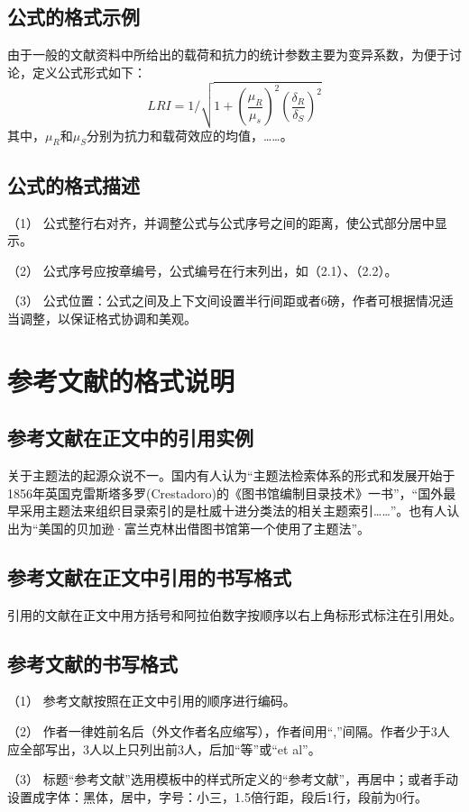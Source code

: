 \subsection{公式的格式示例}
由于一般的文献资料中所给出的载荷和抗力的统计参数主要为变异系数，为便于讨论，定义公式形式如下：
\begin{equation}
LRI = 1/\sqrt{1+(\frac{\mu_R}{\mu_s})^2(\frac{\delta_R}{\delta_S})^2}
\end{equation}
其中，$\mu_R$和$\mu_S$分别为抗力和载荷效应的均值，……。

\subsection{公式的格式描述}
（1） 公式整行右对齐，并调整公式与公式序号之间的距离，使公式部分居中显示。

（2） 公式序号应按章编号，公式编号在行末列出，如（2.1）、（2.2）。

（3） 公式位置：公式之间及上下文间设置半行间距或者6磅，作者可根据情况适当调整，以保证格式协调和美观。

\section{参考文献的格式说明}
\subsection{参考文献在正文中的引用实例}
关于主题法的起源众说不一。国内有人认为“主题法检索体系的形式和发展开始于1856年英国克雷斯塔多罗(Crestadoro)的《图书馆编制目录技术》一书”，“国外最早采用主题法来组织目录索引的是杜威十进分类法的相关主题索引……”。也有人认出为“美国的贝加逊·富兰克林出借图书馆第一个使用了主题法”。

\subsection{参考文献在正文中引用的书写格式}
引用的文献在正文中用方括号和阿拉伯数字按顺序以右上角标形式标注在引用处。

\subsection{参考文献的书写格式}
（1） 参考文献按照在正文中引用的顺序进行编码。

（2） 作者一律姓前名后（外文作者名应缩写），作者间用“,”间隔。作者少于3人应全部写出，3人以上只列出前3人，后加“等”或“et al”。

（3） 标题“参考文献”选用模板中的样式所定义的“参考文献”，再居中；或者手动设置成字体：黑体，居中，字号：小三，1.5倍行距，段后1行，段前为0行。

